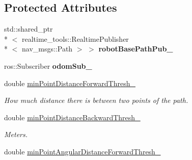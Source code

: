 \subsection*{Protected Attributes}
\begin{DoxyCompactItemize}
\item 
\hypertarget{classsmacc__odom__tracker_1_1OdomTracker_a32d060919f2630e0695ce016c0563a3f}{std\-::shared\-\_\-ptr\\*
$<$ realtime\-\_\-tools\-::\-Realtime\-Publisher\\*
$<$ nav\-\_\-msgs\-::\-Path $>$ $>$ {\bfseries robot\-Base\-Path\-Pub\-\_\-}}\label{classsmacc__odom__tracker_1_1OdomTracker_a32d060919f2630e0695ce016c0563a3f}

\item 
\hypertarget{classsmacc__odom__tracker_1_1OdomTracker_a901bd60f4c1d21537a160d034ff504ef}{ros\-::\-Subscriber {\bfseries odom\-Sub\-\_\-}}\label{classsmacc__odom__tracker_1_1OdomTracker_a901bd60f4c1d21537a160d034ff504ef}

\item 
\hypertarget{classsmacc__odom__tracker_1_1OdomTracker_a0017d7740d99c2cc8ba946495b96ce41}{double \hyperlink{classsmacc__odom__tracker_1_1OdomTracker_a0017d7740d99c2cc8ba946495b96ce41}{min\-Point\-Distance\-Forward\-Thresh\-\_\-}}\label{classsmacc__odom__tracker_1_1OdomTracker_a0017d7740d99c2cc8ba946495b96ce41}

\begin{DoxyCompactList}\small\item\em How much distance there is between two points of the path. \end{DoxyCompactList}\item 
\hypertarget{classsmacc__odom__tracker_1_1OdomTracker_a79d94520c5da1852602aaf264377a82f}{double \hyperlink{classsmacc__odom__tracker_1_1OdomTracker_a79d94520c5da1852602aaf264377a82f}{min\-Point\-Distance\-Backward\-Thresh\-\_\-}}\label{classsmacc__odom__tracker_1_1OdomTracker_a79d94520c5da1852602aaf264377a82f}

\begin{DoxyCompactList}\small\item\em Meters. \end{DoxyCompactList}\item 
\hypertarget{classsmacc__odom__tracker_1_1OdomTracker_a1611f6e11f48e8c2bdf6d16adf35fa2a}{double \hyperlink{classsmacc__odom__tracker_1_1OdomTracker_a1611f6e11f48e8c2bdf6d16adf35fa2a}{min\-Point\-Angular\-Distance\-Forward\-Thresh\-\_\-}}\label{classsmacc__odom__tracker_1_1OdomTracker_a1611f6e11f48e8c2bdf6d16adf35fa2a}


\end{DoxyCompactItemize}
